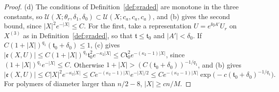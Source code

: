 \begin{proof}
(d) The conditions of Definition~\ref{def:graded} are monotone in the three constants, so $\mathcal U(X;\theta_r,\delta_1,\delta_0)\subset\mathcal U(X;c_a,c_a,c_a)$, and (b) gives the second bound, since $|X|^2e^{-|X|}\le C$. For the first, take a representation $U=e^{\ii\eta A'}U_r$ on $X^{(3)}$ as in Definition~\ref{def:graded}, so that $\mathfrak t\le\mathfrak t_0$ and $|A'|<\delta_0$. If $C(1+|X|)^{q_1}(\mathfrak t_0+\delta_0)\le1$, (c) gives $|\mathfrak e(X,U)|\le C(1+|X|)^{q_1}\mathfrak t_0^2e^{-\kappa_2|X|}\le C\mathfrak t_0^2e^{-(\kappa_2-1)|X|}$, since $(1+|X|)^{q_1}e^{-|X|}\le C$. Otherwise $1+|X|>(C(\mathfrak t_0+\delta_0))^{-1/q_1}$, and (b) gives
\[
|\mathfrak e(X,U)|\le C|X|^2e^{-\kappa_2|X|}\le Ce^{-(\kappa_2-1)|X|}e^{-|X|/2}\le Ce^{-(\kappa_2-1)|X|}\exp\big(-c(\mathfrak t_0+\delta_0)^{-1/q_1}\big).
\]
For polymers of diameter larger than $n/2-8$, $|X|\ge cn/M$.
\end{proof}

